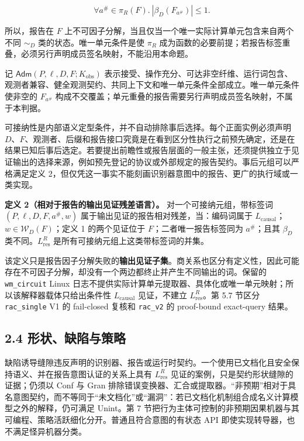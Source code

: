 \documentclass[
  11pt,
  a4paper,
]{ctexart}
\begin{document}
\[\forall a^\#\in\pi_R(F).\ |\beta_D(F_{a^\#})|\le1.\]

所以，报告在 \(F\)
上不可因子分解，当且仅当一个唯一实际计算单元包含来自两个不同 \(\sim_D\)
类的状态。唯一单元条件是使 \(\pi_R\)
成为函数的必要前提；若报告标签重叠，必须另行声明成员签名映射，不能沿用本命题。

记 \(\mathsf{Adm}(P,\ell,D,F;K_{\mathrm{obs}})\)
表示接受、操作充分、可达非空纤维、运行词包含、观测者兼容、健全观测契约、共同上下文和唯一单元条件全部成立。唯一单元条件使非空的
\(F_{a^\#}\)
构成不交覆盖；单元重叠的报告需要另行声明成员签名映射，不属于本判据。

可接纳性是内部语义定型条件，并不自动排除事后选择。每个正面实例必须声明
\(D\)、\(F\)、观测者、后缀和报告接口究竟是在看到区分性执行之前预先确定，还是在结果已知后事后选定。若要提出前瞻性或报告层面的一般主张，还须提供独立于见证输出的选择来源，例如预先登记的协议或外部规定的报告契约。事后元组可以严格满足定义
2，但仅凭这一事实不能刻画识别器意图中的报告、更广的执行域或一类实现。

\textbf{定义 2（相对于报告的输出见证残差语言）。}
对一个可接纳元组，带标签词 \((P,\ell,D,F,a^\#,w)\)
属于输出见证的报告相对残差，当：编码词属于
\(L_{\mathrm{causal}}\)；\(w\in\mathcal W_D(F)\)；定义 1 的两个见证位于
\(F\)；二者唯一报告标签同为 \(a^\#\)；且其 \(\beta_D\)
类不同。\(L_{\mathrm{res}}^R\) 是所有可接纳元组上这类带标签词的并集。

该定义只是报告因子分解失败的\textbf{输出见证子集}。商关系也区分有定义性，因此可能存在不可因子分解，却没有一个两边都终止并产生不同输出的词。保留的
\texttt{wm\_circuit} Linux
日志不提供实际计算单元提取器、具体化或唯一单元映射；所以该解释器载体只给出条件性
\(L_{\mathrm{causal}}\) 见证，不建立 \(L_{\mathrm{res}}^R\)。第 5.7
节区分 \texttt{rac\_single} V1 的 fail-closed 复核和 \texttt{rac\_v2} 的
proof-bound exact-query 结果。

\hypertarget{24-ux5f62ux72b6ux7f3aux9677ux4e0eux7b56ux7565}{%
\subsection{2.4
形状、缺陷与策略}\label{24-ux5f62ux72b6ux7f3aux9677ux4e0eux7b56ux7565}}

缺陷诱导缝隙违反声明的识别器、报告或运行时契约。一个使用已文档化且安全保持语义、并在报告意图认证的关系上具有
\(L_{\mathrm{res}}^R\) 见证的案例，只是契约形状缝隙的证据；仍须以 Conf
与 Gran
排除错误变换器、汇合或提取器。``非预期''相对于具名意图契约，而不等同于``未文档化''或``漏洞''：若已文档化机制组合成名义计算模型之外的解释，仍可满足
Unint。第 7
节把行为主体可控制的非预期因果机器与其可编程、策略活跃细化分开。普通且符合意图的有状态
API 即使实现转导器，也不满足怪异机器分类。
\end{document}
